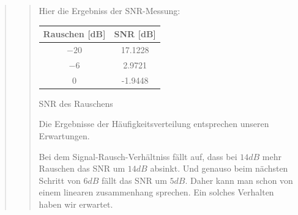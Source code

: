 \begin{quote}
\begin{quote}
        
        Hier die Ergebniss der SNR-Messung:
            \begin{center}
                  \begin{tabular}{|c|c|}
                  \hline
                   Rauschen [dB] &  SNR [dB] \\ \hline 
                   $-20$ &  17.1228 \\ \hline
                   $-6$ &  2.9721 \\ \hline
                   $0$ &  -1.9448 \\ \hline           
                 \end{tabular}\vspace{1em}
                 
            \caption{SNR des Rauschens}            
            \end{center}
    
        Die Ergebnisse der Häufigkeitsverteilung entsprechen unseren Erwartungen. 
    
        Bei dem Signal-Rausch-Verhältniss fällt auf, dass bei $14dB$ mehr Rauschen das SNR um $14dB$ absinkt. Und
        genauso beim nächsten Schritt von $6dB$ fällt das SNR um $5dB$. Daher kann man schon von einem linearen
        zusammenhang sprechen. Ein solches Verhalten haben wir erwartet. 
        
    \end{quote}
\end{quote}


